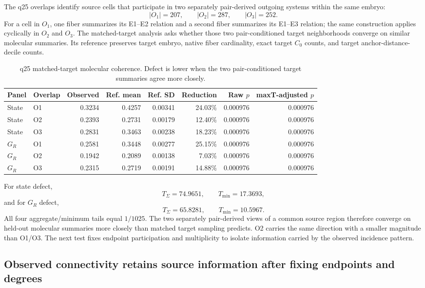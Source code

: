 \documentclass[11pt]{article}
\newcommand{\Czero}{C_0}
\begin{document}
The q25 overlaps identify source cells that participate in two separately pair-derived outgoing systems within the same embryo:
\[
|O_1|=207,\qquad |O_2|=287,\qquad |O_3|=252.
\]
For a cell in \(O_1\), one fiber summarizes its E1--E2 relation and a second fiber summarizes its E1--E3 relation; the same construction applies cyclically in \(O_2\) and \(O_3\). The matched-target analysis asks whether those two pair-conditioned target neighborhoods converge on similar molecular summaries. Its reference preserves target embryo, native fiber cardinality, exact target \(\Czero\) counts, and target anchor-distance-decile counts.

\begin{table}[H]
\centering
\scriptsize
\setlength{\tabcolsep}{3.4pt}
\caption{q25 matched-target molecular coherence. Defect is lower when the two pair-conditioned target summaries agree more closely.}
\label{tab:matched_primary}
\begin{tabular}{@{}llrrrrrr@{}}
\toprule
Panel & Overlap & Observed & Ref. mean & Ref. SD & Reduction & Raw \(p\) & maxT-adjusted \(p\)\\
\midrule
State&O1&0.3234&0.4257&0.00341&24.03\%&0.000976&0.000976\\
State&O2&0.2393&0.2731&0.00179&12.40\%&0.000976&0.000976\\
State&O3&0.2831&0.3463&0.00238&18.23\%&0.000976&0.000976\\
\(G_R\)&O1&0.2581&0.3448&0.00277&25.15\%&0.000976&0.000976\\
\(G_R\)&O2&0.1942&0.2089&0.00138&7.03\%&0.000976&0.000976\\
\(G_R\)&O3&0.2315&0.2719&0.00191&14.88\%&0.000976&0.000976\\
\bottomrule
\end{tabular}
\end{table}

For state defect,
\[
T_\Sigma=74.9651,\qquad T_{\min}=17.3693,
\]
and for \(G_R\) defect,
\[
T_\Sigma=65.8281,\qquad T_{\min}=10.5967.
\]
All four aggregate/minimum tails equal \(1/1025\). The two separately pair-derived views of a common source region therefore converge on held-out molecular summaries more closely than matched target sampling predicts. O2 carries the same direction with a smaller magnitude than O1/O3. The next test fixes endpoint participation and multiplicity to isolate information carried by the observed incidence pattern.

\subsection{Observed connectivity retains source information after fixing endpoints and degrees}
\end{document}
